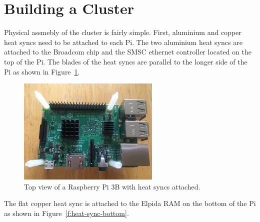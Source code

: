 \section{Building a Cluster}
  Physical assmebly of the cluster is fairly
simple. First, aluminium and copper heat syncs need to be attached to
each Pi. The two aluminium heat syncs are attached to the Broadcom
chip and the SMSC ethernet controller located on the top of the
Pi. The blades of the heat syncs are parallel to the longer side of
the Pi as shown in Figure~\ref{f:heat-sync-top}.

\begin{figure}[!ht]
  \centering\includegraphics[width=\columnwidth]{images/heat-sync-top.jpg}
  \caption{Top view of a Raspberry Pi 3B with heat syncs attached.}\label{f:heat-sync-top}
\end{figure}

The flat copper heat sync is attached to the Elpida RAM on the bottom
of the Pi as shown in Figure~\ref{f:heat-sync-bottom}.

